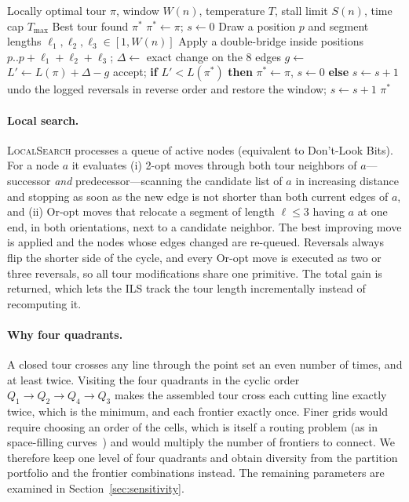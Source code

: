 \documentclass[runningheads]{llncs}
\begin{document}
\begin{algorithm}
\caption{\textsc{Polish} --- stagnation-driven localized ILS}
\label{alg:polish}
\begin{algorithmic}[1]
\Require Locally optimal tour $\pi$, window $W(n)$, temperature $T$,
         stall limit $S(n)$, time cap $T_{\max}$
\Ensure Best tour found $\pi^*$
\State $\pi^*\gets\pi$; $s\gets 0$
  \State Draw a position $p$ and segment lengths $\ell_1,\ell_2,\ell_3\in[1,W(n)]$
  \State Apply a double-bridge inside positions $p..p{+}\ell_1{+}\ell_2{+}\ell_3$;
         $\Delta\gets$ exact change on the 8 edges
  \State $g\gets$ 
  \State $L'\gets L(\pi)+\Delta-g$
    \State accept; \textbf{if} $L'<L(\pi^*)$ \textbf{then} $\pi^*\gets\pi$, $s\gets 0$
           \textbf{else} $s\gets s+1$
  \Else
    \State undo the logged reversals in reverse order and restore the window;
           $s\gets s+1$
  \EndIf
\EndWhile
\State \Return $\pi^*$
\end{algorithmic}
\end{algorithm}

\paragraph{Local search.}
\textsc{LocalSearch} processes a queue of active nodes (equivalent to
Don't-Look Bits). For a node $a$ it evaluates (i) 2-opt moves through
both tour neighbors of $a$---successor \emph{and} predecessor---scanning
the candidate list of $a$ in increasing distance and stopping as soon
as the new edge is not shorter than both current edges of $a$, and
(ii) Or-opt moves that relocate a segment of length $\ell\le 3$ having
$a$ at one end, in both orientations, next to a candidate neighbor.
The best improving move is applied and the nodes whose edges changed
are re-queued. Reversals always flip the shorter side of the cycle, and
every Or-opt move is executed as two or three reversals, so all tour
modifications share one primitive. The total gain is returned, which
lets the ILS track the tour length incrementally instead of recomputing
it.

\paragraph{Why four quadrants.} A closed tour crosses any line through
the point set an even number of times, and at least twice. Visiting the
four quadrants in the cyclic order $Q_1\!\to\!Q_2\!\to\!Q_4\!\to\!Q_3$
makes the assembled tour cross each cutting line exactly twice, which
is the minimum, and each frontier exactly once. Finer grids would
require choosing an order of the cells, which is itself a routing
problem (as in space-filling curves~\cite{bartholdi1982spacefilling})
and would multiply the number of frontiers to connect. We therefore keep
one level of four quadrants and obtain diversity from the partition
portfolio and the frontier combinations instead. The remaining
parameters are examined in Section~\ref{sec:sensitivity}.
\end{document}
